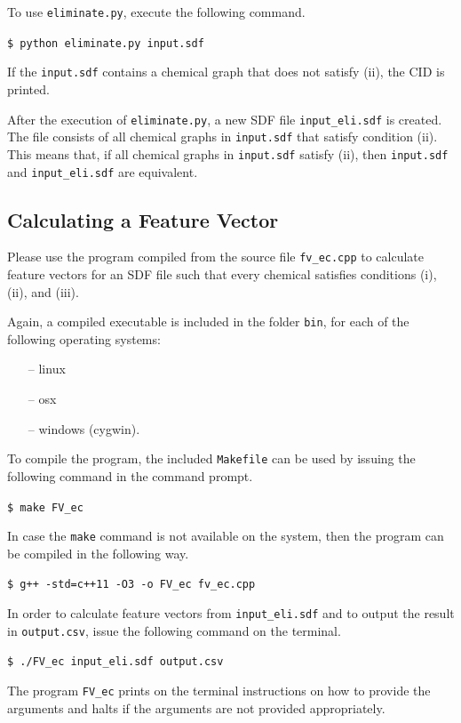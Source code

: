 \documentclass[11pt,titlepage,dvipdfmx,twoside]{book}
\begin{document}
To use {\tt eliminate.py}, execute the following command. 

\begin{oframed}
{\small
\verb|$ python eliminate.py input.sdf|
}
\end{oframed}

If the {\tt input.sdf} contains a chemical graph
that does not satisfy (ii), the CID is printed.

After the execution of {\tt eliminate.py},
a new SDF file {\tt input\_eli.sdf} is created.
The file consists of all chemical graphs in {\tt input.sdf}
that satisfy condition (ii).
%
This means that, if all chemical graphs in {\tt input.sdf}
satisfy (ii), then
{\tt input.sdf} and {\tt input\_eli.sdf} are equivalent. 


\subsection{Calculating a Feature Vector}
Please use the program compiled from the source file
{\tt fv\_ec.cpp} %
to calculate feature vectors for an SDF file
such that every chemical 
satisfies conditions (i), (ii), and (iii).

Again, a compiled executable is included in the folder {\tt bin},
for each of the following operating systems:
%
\begin{itemize}
 \item [--] linux
 \item [--] osx
 \item [--] windows (cygwin).
\end{itemize}

To compile the program, the included {\tt Makefile}
can be used by issuing the following command in the
command prompt. 
\begin{oframed}
{\small
\verb|$ make FV_ec|
}
\end{oframed}
%
In case the {\tt make} command is not
available on the system,
then the program can be compiled in the following way. 
\begin{oframed}
{\small
\verb|$ g++ -std=c++11 -O3 -o FV_ec fv_ec.cpp|
}
\end{oframed}


In order to calculate feature vectors from {\tt input\_eli.sdf} and to output the result in {\tt output.csv},
issue the following command on the terminal. 
\begin{oframed}
{\small
\verb|$ ./FV_ec input_eli.sdf output.csv|
}
\end{oframed}
The program {\tt FV\_ec} prints on the terminal instructions on how to provide the arguments
and halts if the arguments are not provided appropriately.
\end{document}
